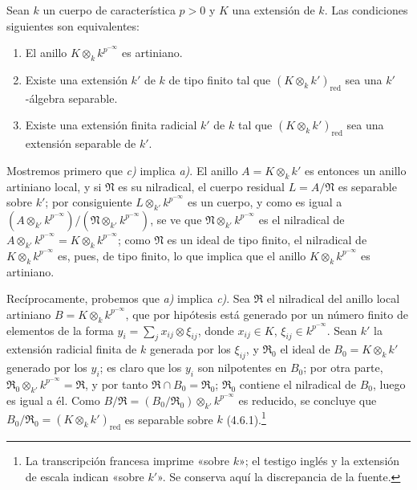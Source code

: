 \begin{lemma}[18.11.12.1]
\label{IV.18.11.12.1}
Sean $k$ un cuerpo de característica $p>0$ y $K$ una extensión de $k$. Las condiciones siguientes son equivalentes:
\begin{enumerate}
  \item[\textup{a)}] El anillo $K\otimes_k k^{p^{-\infty}}$ es artiniano.
  \item[\textup{b)}] Existe una extensión $k'$ de $k$ de tipo finito tal que $(K\otimes_k k')_{\mathrm{red}}$ sea una $k'$-álgebra separable.
  \item[\textup{c)}] Existe una extensión finita radicial $k'$ de $k$ tal que $(K\otimes_k k')_{\mathrm{red}}$ sea una extensión separable de $k'$.
\end{enumerate}
\end{lemma}

Mostremos primero que \emph{c)} implica \emph{a)}. El anillo $A=K\otimes_k k'$ es entonces un anillo artiniano local, y si $\mathfrak N$ es su nilradical, el cuerpo residual $L=A/\mathfrak N$ es separable sobre $k'$; por consiguiente $L\otimes_{k'}k^{p^{-\infty}}$ es un cuerpo, y como es igual a
$(A\otimes_{k'}k^{p^{-\infty}})/(\mathfrak N\otimes_{k'}k^{p^{-\infty}})$,
se ve que $\mathfrak N\otimes_{k'}k^{p^{-\infty}}$ es el nilradical de $A\otimes_{k'}k^{p^{-\infty}}=K\otimes_k k^{p^{-\infty}}$; como $\mathfrak N$ es un ideal de tipo finito, el nilradical de $K\otimes_k k^{p^{-\infty}}$ es, pues, de tipo finito, lo que implica que el anillo $K\otimes_k k^{p^{-\infty}}$ es artiniano.

Recíprocamente, probemos que \emph{a)} implica \emph{c)}. Sea $\mathfrak R$ el nilradical del anillo local artiniano $B=K\otimes_k k^{p^{-\infty}}$, que por hipótesis está generado por un número finito de elementos de la forma
$y_i=\sum_j x_{ij}\otimes\xi_{ij}$, donde $x_{ij}\in K$, $\xi_{ij}\in k^{p^{-\infty}}$.
Sean $k'$ la extensión radicial finita de $k$ generada por los $\xi_{ij}$, y $\mathfrak R_0$ el ideal de $B_0=K\otimes_k k'$ generado por los $y_i$; es claro que los $y_i$ son nilpotentes en $B_0$; por otra parte, $\mathfrak R_0\otimes_{k'}k^{p^{-\infty}}=\mathfrak R$, y por tanto $\mathfrak R\cap B_0=\mathfrak R_0$; $\mathfrak R_0$ contiene el nilradical de $B_0$, luego es igual a él. Como $B/\mathfrak R=(B_0/\mathfrak R_0)\otimes_{k'}k^{p^{-\infty}}$ es reducido, se concluye que $B_0/\mathfrak R_0=(K\otimes_k k')_{\mathrm{red}}$ es separable sobre $k$ (4.6.1).\footnote{La transcripción francesa imprime «sobre $k$»; el testigo inglés y la extensión de escala indican «sobre $k'$». Se conserva aquí la discrepancia de la fuente.}

